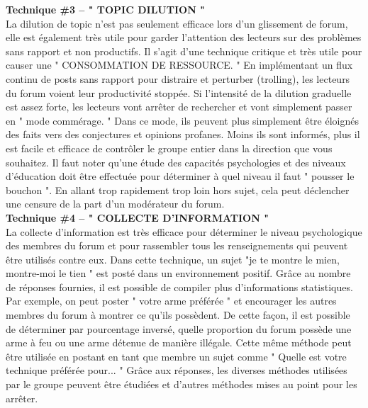 \documentclass[11pt,twoside,a4paper]{article}
\begin{document}
\textbf{\large Technique \#3 -- " TOPIC DILUTION "}~\\

La dilution de topic n'est pas seulement efficace lors d'un glissement de forum, elle est {\'e}galement tr{\`e}s utile pour garder l'attention des lecteurs sur des probl{\`e}mes sans rapport et non productifs. Il s'agit d'une technique critique et tr{\`e}s utile pour causer une " CONSOMMATION DE RESSOURCE. " En impl{\'e}mentant un flux continu de posts sans rapport pour distraire et perturber (trolling), les lecteurs du forum voient leur productivit{\'e} stopp{\'e}e. Si l'intensit{\'e} de la dilution graduelle est assez forte, les lecteurs vont arr{\^e}ter de rechercher et vont simplement passer en " mode comm{\'e}rage. " Dans ce mode, ils peuvent plus simplement {\^e}tre {\'e}loign{\'e}s des faits vers des conjectures et opinions profanes. Moins ils sont inform{\'e}s, plus il est facile et efficace de contr{\^o}ler le groupe entier dans la direction que vous souhaitez. Il faut noter qu'une {\'e}tude des capacit{\'e}s psychologies et des niveaux d'{\'e}ducation doit {\^e}tre effectu{\'e}e pour d{\'e}terminer {\`a} quel niveau il faut " pousser le bouchon ". En allant trop rapidement trop loin hors sujet, cela peut d{\'e}clencher une censure de la part d'un mod{\'e}rateur du forum.~\\

\textbf{\large Technique \#4 -- " COLLECTE D'INFORMATION "}~\\

La collecte d'information est tr{\`e}s efficace pour d{\'e}terminer le niveau psychologique des membres du forum et pour rassembler tous les renseignements qui peuvent {\^e}tre utilis{\'e}s contre eux. Dans cette technique, un sujet "je te montre le mien, montre-moi le tien " est post{\'e} dans un environnement positif. Gr{\^a}ce au nombre de r{\'e}ponses fournies, il est possible de compiler plus d'informations statistiques. Par exemple, on peut poster " votre arme pr{\'e}f{\'e}r{\'e}e " et encourager les autres membres du forum {\`a} montrer ce qu'ils poss{\`e}dent. De cette fa\c{c}on, il est possible de d{\'e}terminer par pourcentage invers{\'e}, quelle proportion du forum poss{\`e}de une arme {\`a} feu ou une arme d{\'e}tenue de mani{\`e}re ill{\'e}gale. Cette m{\^e}me m{\'e}thode peut {\^e}tre utilis{\'e}e en postant en tant que membre un sujet comme " Quelle est votre technique pr{\'e}f{\'e}r{\'e}e pour... " Gr{\^a}ce aux r{\'e}ponses, les diverses m{\'e}thodes utilis{\'e}es par le groupe peuvent {\^e}tre {\'e}tudi{\'e}es et d'autres m{\'e}thodes mises au point pour les arr{\^e}ter.~\\
\end{document}
